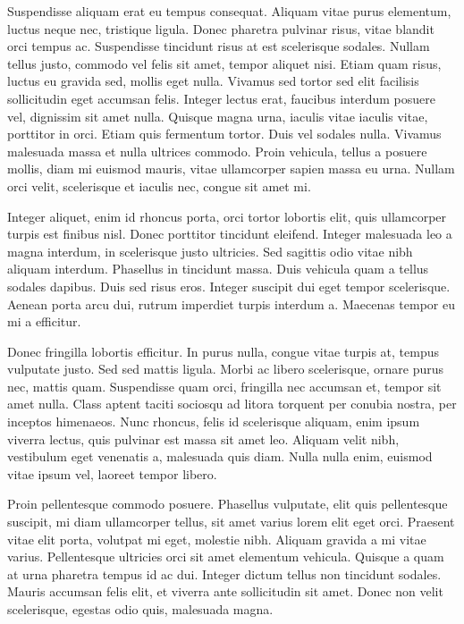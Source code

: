 Suspendisse aliquam erat eu tempus consequat. Aliquam vitae purus elementum, luctus neque nec, tristique ligula. Donec pharetra pulvinar risus, vitae blandit orci tempus ac. Suspendisse tincidunt risus at est scelerisque sodales. Nullam tellus justo, commodo vel felis sit amet, tempor aliquet nisi. Etiam quam risus, luctus eu gravida sed, mollis eget nulla. Vivamus sed tortor sed elit facilisis sollicitudin eget accumsan felis. Integer lectus erat, faucibus interdum posuere vel, dignissim sit amet nulla. Quisque magna urna, iaculis vitae iaculis vitae, porttitor in orci. Etiam quis fermentum tortor. Duis vel sodales nulla. Vivamus malesuada massa et nulla ultrices commodo. Proin vehicula, tellus a posuere mollis, diam mi euismod mauris, vitae ullamcorper sapien massa eu urna. Nullam orci velit, scelerisque et iaculis nec, congue sit amet mi.

Integer aliquet, enim id rhoncus porta, orci tortor lobortis elit, quis ullamcorper turpis est finibus nisl. Donec porttitor tincidunt eleifend. Integer malesuada leo a magna interdum, in scelerisque justo ultricies. Sed sagittis odio vitae nibh aliquam interdum. Phasellus in tincidunt massa. Duis vehicula quam a tellus sodales dapibus. Duis sed risus eros. Integer suscipit dui eget tempor scelerisque. Aenean porta arcu dui, rutrum imperdiet turpis interdum a. Maecenas tempor eu mi a efficitur.

Donec fringilla lobortis efficitur. In purus nulla, congue vitae turpis at, tempus vulputate justo. Sed sed mattis ligula. Morbi ac libero scelerisque, ornare purus nec, mattis quam. Suspendisse quam orci, fringilla nec accumsan et, tempor sit amet nulla. Class aptent taciti sociosqu ad litora torquent per conubia nostra, per inceptos himenaeos. Nunc rhoncus, felis id scelerisque aliquam, enim ipsum viverra lectus, quis pulvinar est massa sit amet leo. Aliquam velit nibh, vestibulum eget venenatis a, malesuada quis diam. Nulla nulla enim, euismod vitae ipsum vel, laoreet tempor libero.

Proin pellentesque commodo posuere. Phasellus vulputate, elit quis pellentesque suscipit, mi diam ullamcorper tellus, sit amet varius lorem elit eget orci. Praesent vitae elit porta, volutpat mi eget, molestie nibh. Aliquam gravida a mi vitae varius. Pellentesque ultricies orci sit amet elementum vehicula. Quisque a quam at urna pharetra tempus id ac dui. Integer dictum tellus non tincidunt sodales. Mauris accumsan felis elit, et viverra ante sollicitudin sit amet. Donec non velit scelerisque, egestas odio quis, malesuada magna.

